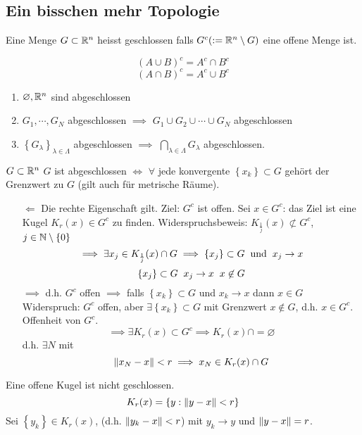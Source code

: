 \subsection{Ein bisschen mehr Topologie}
\begin{Def}
  Eine Menge $G\subset\mathbb{R}^n$ heisst geschlossen falls $G^c(:=\mathbb{R}^n\setminus G)$ eine offene Menge ist.
\end{Def}
\begin{Bem}
  \[(A\cup B)^c = A^c\cap B^c\]
  \[(A\cap B)^c = A^c\cup B^c\]
\end{Bem}
\begin{Sat}
  \begin{enumerate}
    \item $\varnothing, \mathbb{R}^n$ sind abgeschlossen
    \item $G_1,\cdots,G_N$ abgeschlossen $\implies$ $G_1\cup G_2\cup \cdots\cup G_N$ abgeschlossen
    \item $\left\{ G_\lambda \right\}_{\lambda\in\Lambda}$ abgeschlossen $\implies$ $\bigcap_{\lambda\in\Lambda} G_\lambda$ abgeschlossen.
  \end{enumerate}
\end{Sat}
\begin{Sat}
  $G\subset\mathbb{R}^n$ $G$ ist abgeschlossen $\iff$ $\forall$ jede konvergente $\left\{ x_k \right\}\subset G$ gehört der Grenzwert zu $G$ (gilt auch für metrische Räume).
\end{Sat}
\begin{Bew}
  \begin{itemize}
    \item[$\Leftarrow$] Die rechte Eigenschaft gilt. Ziel: $G^c$ ist offen. Sei $x\in G^c$: das Ziel ist eine Kugel $K_r(x)\in G^c$ zu finden. Widerspruchsbeweis: $K_{\frac{1}{j}}(x)\not\subset G^c$, $j\in\mathbb{N}\setminus\left\{ 0 \right\}$
      \[\implies \exists x_j\in K_{\frac{1}{j}}(x)\cap G\implies \left\{ x_j \right\}\subset G\hspace{2mm}\text{und}\hspace{2mm} x_j\to x \]
      \[\left\{ x_j \right\}\subset G\hspace{2mm} x_j\to x\hspace{2mm} x\not\in G\]
      $\implies$ d.h. $G^c$ offen $\implies$ falls $\left\{ x_k \right\}\subset G$ und $x_k\to x$ dann $x\in G$
      Widerspruch: $G^c$ offen, aber $\exists \left\{ x_k \right\}\subset G$ mit Grenzwert $x\not\in G$, d.h. $x\in G^c$. Offenheit von $G^c$.
      \[\implies \exists K_r(x)\subset G^c\implies K_r(x)\cap=\varnothing\]
      d.h. $\exists N$ mit
      \[\left\| x_N-x \right\|<r\implies x_N\in K_r(x)\cap G\]
  \end{itemize}
\end{Bew}
\begin{Bsp}
  Eine offene Kugel ist nicht geschlossen.
  \[K_r(x)=\left\{ y:\left\| y-x \right\|<r \right\}\]
  Sei $\left\{ y_k \right\}\in K_r(x)$, (d.h. $\left\| y_k-x \right\|<r$) mit $y_k\to y$ und $\left\| y-x \right\|=r$.
\end{Bsp}
